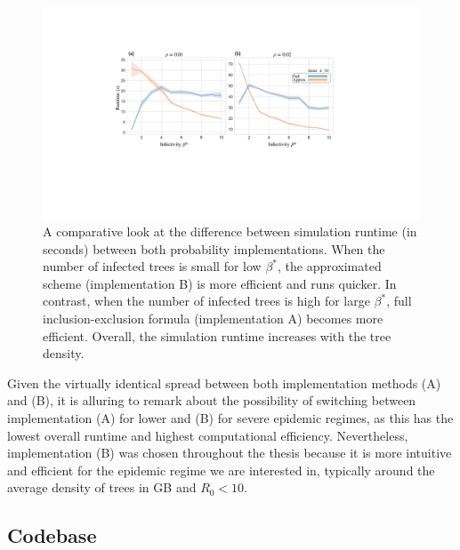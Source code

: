 \begin{figure}
    \centering
    \includegraphics[scale=0.425]{appendix/figures/runtime-comp.pdf}
    \caption{A comparative look at the difference between simulation runtime (in seconds) between both probability implementations.
    When the number of infected trees is small for low $\beta^*$, the approximated scheme (implementation B) is more efficient and runs quicker. 
    In contrast, when the number of infected trees is high for large $\beta^*$, full inclusion-exclusion formula (implementation A) becomes more efficient.
    Overall, the simulation runtime increases with the tree density.
    }
    \label{fig:imp-runtime}
\end{figure}

Given the virtually identical spread between both implementation methods (A) and (B), it is alluring to remark about the possibility of switching between implementation (A) for lower and (B) for severe epidemic regimes, as this has the lowest overall runtime and highest computational efficiency. 
Nevertheless, implementation (B) was chosen throughout the thesis because it is more intuitive and efficient for the epidemic regime we are interested in, typically around the average density of trees in GB and $R_0 < 10$.

\subsection{Codebase}

